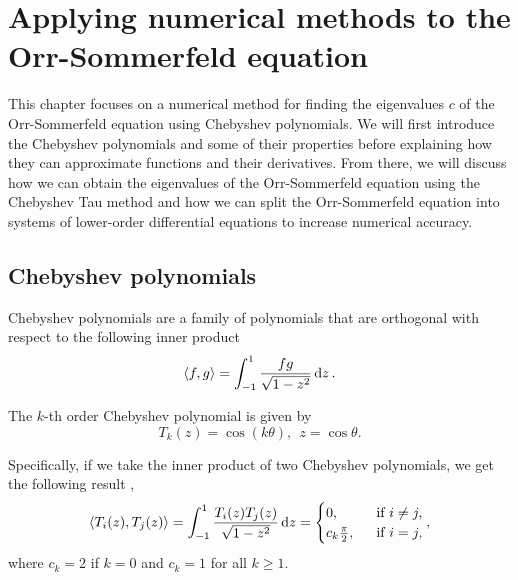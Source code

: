 \chapter{Applying numerical methods to the Orr-Sommerfeld equation} \label{chap:numerics}
This chapter focuses on a numerical method for finding the eigenvalues $ c $ of the Orr-Sommerfeld equation using Chebyshev polynomials. We will first introduce the Chebyshev polynomials and some of their properties before explaining how they can approximate functions and their derivatives. From there, we will discuss how we can obtain the eigenvalues of the Orr-Sommerfeld equation using the Chebyshev Tau method and how we can split the Orr-Sommerfeld equation into systems of lower-order differential equations to increase numerical accuracy.
 
\section{Chebyshev polynomials}

Chebyshev polynomials are a family of polynomials that are orthogonal with respect to the following inner product \citep{bukhari1997spectral}
\begin{equation}
    \langle f, g \rangle = \int^{1}_{-1} \frac{f g}{ \sqrt{1-z^2}} \dd{z}.
\end{equation}

The $k$-th order Chebyshev polynomial is given by
\begin{equation}
    T_k(z) = \cos{(k \theta)},\ \ z = \cos{\theta}.
\label{cheby}
\end{equation}

Specifically, if we take the inner product of two Chebyshev polynomials, we get the following result \citep{canuto2007spectral},
\begin{align}
    \langle T_i(z), T_j(z) \rangle = \int^{1}_{-1} \frac{T_i(z) T_j(z)}{\sqrt{1-z^2}} \dd{z} = \begin{cases}
        0,&\ \ \text{if}\ i \neq j, \\
        c_k \tfrac{\pi}{2},&\ \ \text{if}\ i = j,
    \end{cases},
    \label{chebyip}
\end{align}
where $ c_k = 2 $ if $ k = 0 $ and $ c_k = 1$ for all $ k \geq 1 $.

